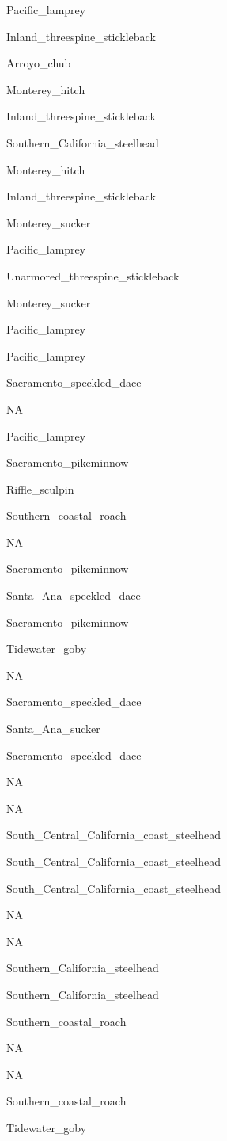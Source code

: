 \documentclass[]{article}
\begin{document}
Pacific\_lamprey

Inland\_threespine\_stickleback

Arroyo\_chub

Monterey\_hitch

Inland\_threespine\_stickleback

Southern\_California\_steelhead

Monterey\_hitch

Inland\_threespine\_stickleback

Monterey\_sucker

Pacific\_lamprey

Unarmored\_threespine\_stickleback

Monterey\_sucker

Pacific\_lamprey

Pacific\_lamprey

Sacramento\_speckled\_dace

NA

Pacific\_lamprey

Sacramento\_pikeminnow

Riffle\_sculpin

Southern\_coastal\_roach

NA

Sacramento\_pikeminnow

Santa\_Ana\_speckled\_dace

Sacramento\_pikeminnow

Tidewater\_goby

NA

Sacramento\_speckled\_dace

Santa\_Ana\_sucker

Sacramento\_speckled\_dace

NA

NA

South\_Central\_California\_coast\_steelhead

South\_Central\_California\_coast\_steelhead

South\_Central\_California\_coast\_steelhead

NA

NA

Southern\_California\_steelhead

Southern\_California\_steelhead

Southern\_coastal\_roach

NA

NA

Southern\_coastal\_roach

Tidewater\_goby
\end{document}
